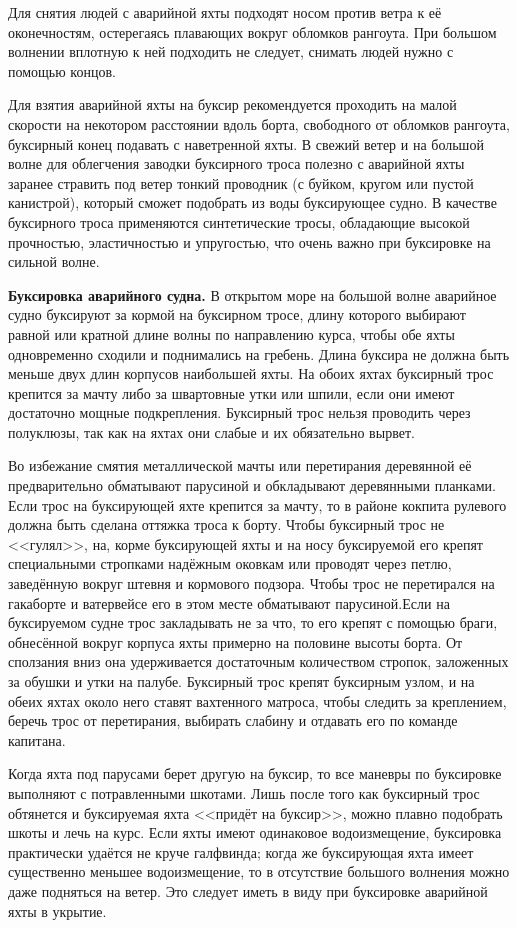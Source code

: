Для снятия людей с аварийной яхты подходят носом против ветра к её
оконечностям, остерегаясь плавающих вокруг обломков рангоута. При
большом волнении вплотную к ней подходить не следует, снимать людей
нужно с помощью концов.

Для взятия аварийной яхты на буксир рекомендуется проходить на малой
скорости на некотором расстоянии вдоль борта, свободного от обломков
рангоута, буксирный конец подавать с наветренной яхты. В свежий ветер
и на большой волне для облегчения заводки буксирного троса полезно с
аварийной яхты заранее стравить под ветер тонкий проводник (с буйком,
кругом или пустой канистрой), который сможет подобрать из воды
буксирующее судно. В качестве буксирного троса применяются
синтетические тросы, обладающие высокой прочностью, эластичностью и
упругостью, что очень важно при буксировке на сильной волне.

\textbf{Буксировка аварийного судна.} В открытом море на большой волне
аварийное судно буксируют за кормой на буксирном тросе, длину которого
выбирают равной или кратной длине волны по направлению курса, чтобы
обе яхты одновременно сходили и поднимались на гребень. Длина буксира
не должна быть меньше двух длин корпусов наибольшей яхты. На обоих
яхтах буксирный трос крепится за мачту либо за швартовные утки или
шпили, если они имеют достаточно мощные подкрепления. Буксирный трос
нельзя проводить через полуклюзы, так как на яхтах они слабые и их
обязательно вырвет.

Во избежание смятия металлической мачты или перетирания деревянной её
предварительно обматывают парусиной и обкладывают деревянными
планками. Если трос на буксирующей яхте крепится за мачту, то в районе
кокпита рулевого должна быть сделана оттяжка троса к борту. Чтобы
буксирный трос не <<гулял>>, на, корме буксирующей яхты и на носу
буксируемой его крепят специальными стропками надёжным оковкам или
проводят через петлю, заведённую вокруг штевня и кормового
подзора. Чтобы трос не перетирался на гакаборте и ватервейсе его в
этом месте обматывают парусиной.Если на буксируемом судне трос
закладывать не за что, то его крепят с помощью браги, обнесённой
вокруг корпуса яхты примерно на половине высоты борта. От сползания
вниз она удерживается достаточным количеством стропок, заложенных за
обушки и утки на палубе. Буксирный трос крепят буксирным узлом, и на
обеих яхтах около него ставят вахтенного матроса, чтобы следить за
креплением, беречь трос от перетирания, выбирать слабину и отдавать
его по команде капитана.

Когда яхта под парусами берет другую на буксир, то все маневры по
буксировке выполняют с потравленными шкотами. Лишь после того как
буксирный трос обтянется и буксируемая яхта <<придёт на буксир>>,
можно плавно подобрать шкоты и лечь на курс. Если яхты имеют
одинаковое водоизмещение, буксировка практически удаётся не круче
галфвинда; когда же буксирующая яхта имеет существенно меньшее
водоизмещение, то в отсутствие большого волнения можно даже подняться
на ветер. Это следует иметь в виду при буксировке аварийной яхты в
укрытие.

